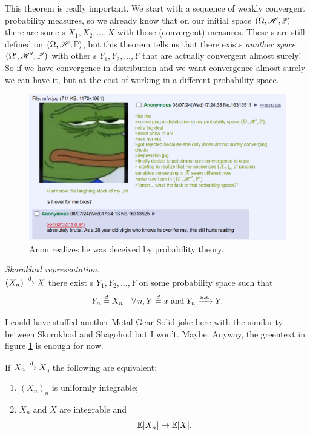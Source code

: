 \documentclass{report}
\begin{document}
This theorem is really important. We start with a sequence of weakly convergent probability measures, so we already know that on our initial space $(\Omega,\mathscr{H},\mathbb{P})$ there are some \rv s $X_1,X_2,\ldots,X$ with those (convergent) measures. These \rv s are still defined on $(\Omega,\mathscr{H},\mathbb{P})$, but this theorem tells us that there exists \textit{another space} $(\Omega',\mathscr{H}',\mathbb{P}')$ with other \rv s $Y_1,Y_2,\ldots,Y$ that are actually convergent almost surely! So if we have convergence in distribution and we want convergence almost surely we can have it, but at the cost of working in a different probability space.
\begin{figure}[h]
	\centering
	\includegraphics[width=\textwidth]{screenshot007}
	\caption[Anon studies probability theory]{Anon realizes he was deceived by probability theory\protect\footnotemark.}
	\label{fig:screenshot007}
\end{figure}
\begin{corollary}
	\emph{Skorokhod representation}.\\
	$(X_n)\xrightarrow[]{\text{d}} X$ \ifonly{} there exist \rv s $Y_1,Y_2,\ldots,Y$ on some probability space such that 
	\[Y_n\stackrel{d}{=}X_n\quad\forall\, n, Y\stackrel{d}{=}x\;\text{and}\;Y_n\xrightarrow[]{\text{a.s.}} Y.\]
\end{corollary}
I could have stuffed another Metal Gear Solid joke here with the similarity between Skorokhod and Shagohod but I won't. Maybe. Anyway, the greentext in figure \ref*{fig:screenshot007} is enough for now. 
\begin{proposition}
	If $X_n\xrightarrow[]{\text{d}} X$, the following are equivalent:
	\begin{enumerate}[\circnum]
		\item ${(X_n)}_{n}$ is uniformly integrable;
		\item $X_n$ and $X$ are integrable and
		\[\mathbb{E}|X_n|\to\mathbb{E}|X|.\]
	\end{enumerate}
\end{proposition}
\end{document}
